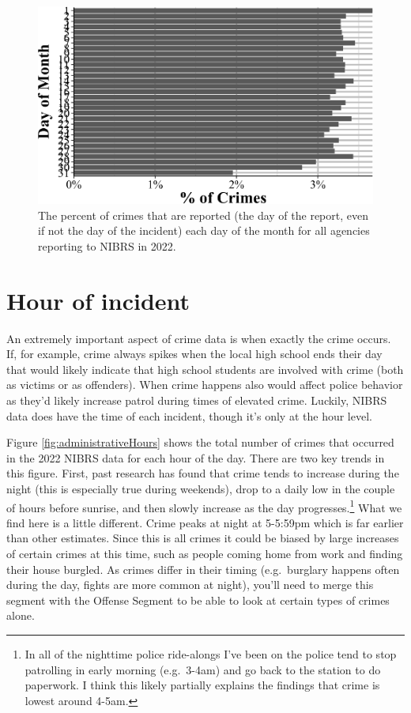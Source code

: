 \documentclass[
  12pt,
  openany]{book}
\begin{document}
\begin{figure}

{\centering \includegraphics[width=0.9\linewidth]{12_nibrs_administrative_files/figure-latex/administrativeMonthDayReport-1} 

}

\caption{The percent of crimes that are reported (the day of the report, even if not the day of the incident) each day of the month for all agencies reporting to NIBRS in 2022.}\label{fig:administrativeMonthDayReport}
\end{figure}

\section{Hour of incident}\label{hour-of-incident}

An extremely important aspect of crime data is when exactly the crime occurs. If, for example, crime always spikes when the local high school ends their day that would likely indicate that high school students are involved with crime (both as victims or as offenders). When crime happens also would affect police behavior as they'd likely increase patrol during times of elevated crime. Luckily, NIBRS data does have the time of each incident, though it's only at the hour level.

Figure \ref{fig:administrativeHours} shows the total number of crimes that occurred in the 2022 NIBRS data for each hour of the day. There are two key trends in this figure. First, past research has found that crime tends to increase during the night (this is especially true during weekends), drop to a daily low in the couple of hours before sunrise, and then slowly increase as the day progresses.\footnote{In all of the nighttime police ride-alongs I've been on the police tend to stop patrolling in early morning (e.g.~3-4am) and go back to the station to do paperwork. I think this likely partially explains the findings that crime is lowest around 4-5am.} What we find here is a little different. Crime peaks at night at 5-5:59pm which is far earlier than other estimates. Since this is all crimes it could be biased by large increases of certain crimes at this time, such as people coming home from work and finding their house burgled. As crimes differ in their timing (e.g.~burglary happens often during the day, fights are more common at night), you'll need to merge this segment with the Offense Segment to be able to look at certain types of crimes alone.
\end{document}
